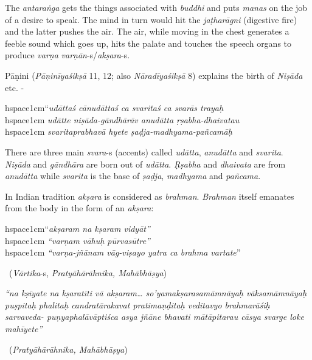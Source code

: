 The \textit{antaraṅga} gets the things associated with \textit{buddhi} and puts \textit{manas} on the job of a desire to speak. The mind in turn would hit the \textit{jaṭharāgni} (digestive fire) and the latter pushes the air. The air, while moving in the chest generates a feeble sound which goes up, hits the palate and touches the speech organs to produce \textit{varṇa} \textit{varṇān}-s/\textit{akṣara}-s.

Pāṇini (\textit{Pāṇinīyaśikṣā} 11, 12; also \textit{Nāradīyaśikṣā} 8) explains the birth of \textit{Niṣāda} etc. -

\begin{myquote}
hspace{1cm}“\textit{udāttaś cānudāttaś ca svaritaś ca svarās trayaḥ }\\hspace{1cm} \textit{udātte niṣāda-gāndhārāv anudātta ṛṣabha-dhaivatau }\\hspace{1cm} \textit{svaritaprabhavā hyete ṣaḍja-madhyama-pañcamāḥ} 
\end{myquote}

There are three main \textit{svara}-s (accents) called \textit{udātta}, \textit{anudātta} and \textit{svarita}. \textit{Niṣāda} and \textit{gāndhāra} are born out of \textit{udātta}. \textit{Ṛṣabha} and \textit{dhaivata} are from \textit{anudātta} while \textit{svarita} is the base of \textit{ṣaḍja}, \textit{madhyama} and \textit{pañcama}.

In Indian tradition \textit{akṣara} is considered as \textit{brahman}. \textit{Brahman} itself emanates from the body in the form of an \textit{akṣara}:

\begin{myquote}
hspace{1cm}“\textit{akṣaram na kṣaram vidyāt”}\\hspace{1cm} \textit{“varṇam vāhuḥ pūrvasūtre”}\\hspace{1cm} \textit{“varṇa-jñānam vāg-viṣayo yatra ca brahma vartate}” 

~\hfill (\textit{Vārtika}-s, \textit{Pratyāhārāhnika, Mahābhāṣya})
\end{myquote}

\begin{myquote}
\textit{“na kṣīyate na kṣaratīti vā akṣaram… so’yamakṣarasamāmnāyaḥ vāksamāmnāyaḥ puṣpitaḥ phalitaḥ candratārakavat pratimaṇḍitaḥ veditavyo brahmarāśiḥ sarvaveda- puṇyaphalāvāptiśca asya jñāne bhavati mātāpitarau cāsya svarge loke mahīyete”} 

~\hfill (\textit{Pratyāhārāhnika, Mahābhāṣya})
\end{myquote}

